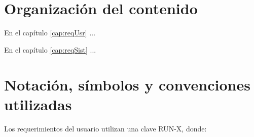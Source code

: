 %	
	
\section{Organización del contenido}

	En el capítulo \ref{cap:reqUsr} ...
	
	En el capítulo \ref{cap:reqSist} ...

\section{Notación, símbolos y convenciones utilizadas}

Los requerimientos del usuario utilizan una clave RUN-X, donde:
	

